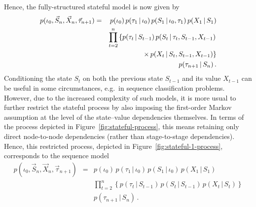 \documentclass[a4paper]{article}
\begin{document}
Hence, the fully-structured stateful model is now given by
\begin{eqnarray}
p(\iota_0,\vec{S}_n,\vec{X}_n,\vec{\tau}_{n+1}) & = & 
p(\iota_0)\,p(\tau_1\,|\,\iota_0)\,p(S_1\,|\,\iota_0,\tau_1)\,p(X_1\,|\,S_1)
\nonumber\\&&
\prod_{t=2}^{n}\left\{p(\tau_t\,|\,S_{t-1})\,p(S_t\,|\,\tau_t,S_{t-1},X_{t-1})\right.
\nonumber\\&&
\left.\hspace*{10mm}\times\, p(X_t\,|\,S_t,S_{t-1},X_{t-1})\right\}
\nonumber\\&&
p(\tau_{n+1}\,|\,S_n)
\,.
\end{eqnarray}
Conditioning the state $S_t$ on both the previous state $S_{t-1}$ and its value $X_{t-1}$
can be useful in some circumstances, e.g.\ in sequence classification problems.
However, due to the increased complexity of such models, it is more usual to further restrict the stateful process
by also imposing the first-order Markov assumption at the level
of the state--value dependencies themselves. In terms of the process depicted in Figure~\ref{fig:stateful-process},
this means retaining only direct node-to-node dependencies (rather than stage-to-stage dependencies).
Hence, this restricted process, depicted in Figure~\ref{fig:stateful-1-process},
corresponds to the sequence model
\begin{eqnarray}
p(\iota_0,\vec{S}_n,\vec{X}_n,\vec{\tau}_{n+1}) & = & 
p(\iota_0)\,p(\tau_1\,|\,\iota_0)\,p(S_1\,|\,\iota_0)\,p(X_1\,|\,S_1)
\nonumber\\&&
\prod_{t=2}^{n}\left\{p(\tau_t\,|\,S_{t-1})\,p(S_t\,|\,S_{t-1})\,p(X_t\,|\,S_t)\right\}
\nonumber\\&&
p(\tau_{n+1}\,|\,S_n)
\,.
\label{eq:stateful-1-model}
\end{eqnarray}
\end{document}
